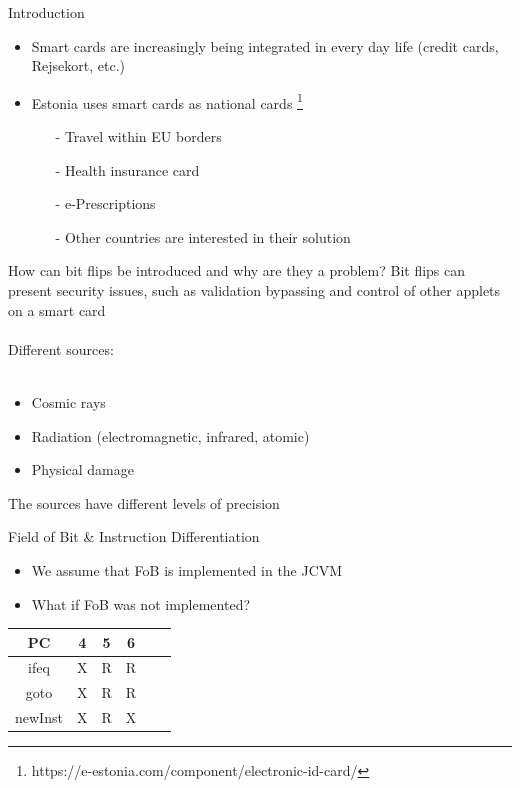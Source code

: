 


\begin{frame}[fragile]{Introduction}
\begin{center}
	\begin{itemize}
	\item Smart cards are increasingly being integrated in every day life (credit cards, Rejsekort, etc.)
	\item Estonia uses smart cards as national cards \footnote{https://e-estonia.com/component/electronic-id-card/}
		\begin{itemize}
		\item[-] Travel within EU borders
		\item[-] Health insurance card
		\item[-] e-Prescriptions
		\item[-] Other countries are interested in their solution
		\end{itemize}
	\end{itemize}
\end{center}
\end{frame}

\begin{frame}[fragile]{\large How can bit flips be introduced and why are they a problem?}
Bit flips can present security issues, such as validation bypassing and control of other applets on a smart card\\~\\
Different sources:\\~\\
	\begin{itemize}
	\item Cosmic rays
	\item Radiation (electromagnetic, infrared, atomic)
	\item Physical damage
	\end{itemize}
	
The sources have different levels of precision
\end{frame}
\begin{frame}[fragile]{Field of Bit \& Instruction Differentiation}
\begin{itemize}
\item We assume that FoB is implemented in the JCVM
\item What if FoB was not implemented?
\end{itemize}
\begin{table}
\centering
\begin{tabular}{|c|c|c|c|c|c|}
\hline PC & 4 & 5 & 6   \\ 
\hline ifeq & X & R & R \\ 
\hline goto & X & R & R \\ 
\hline newInst & X & R & X \\ 
\hline 
\end{tabular} 
\end{table}
\end{frame}

